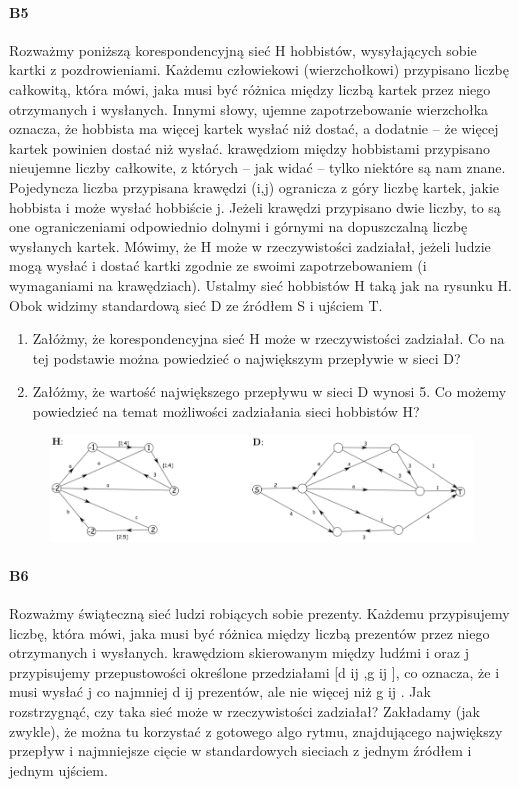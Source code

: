 \paragraph{B5} Rozważmy poniższą korespondencyjną  sieć H hobbistów, wysyłających sobie kartki z pozdrowieniami. Każdemu człowiekowi (wierzchołkowi) przypisano liczbę całkowitą, która mówi, jaka musi być różnica między liczbą  kartek przez niego otrzymanych i wysłanych. Innymi słowy, ujemne zapotrzebowanie wierzchołka oznacza, że hobbista ma więcej kartek wysłać niż dostać, a dodatnie – że więcej kartek powinien dostać niż wysłać. krawędziom między hobbistami przypisano nieujemne liczby całkowite, z których – jak widać – tylko niektóre są nam znane. Pojedyncza liczba przypisana krawędzi (i,j) ogranicza z góry liczbę kartek, jakie hobbista i może wysłać hobbiście j. Jeżeli krawędzi przypisano dwie liczby, to są one ograniczeniami odpowiednio dolnymi i górnymi na dopuszczalną liczbę wysłanych kartek. Mówimy, że H może w rzeczywistości zadziałał, jeżeli ludzie mogą wysłać i dostać kartki zgodnie ze swoimi zapotrzebowaniem (i wymaganiami na krawędziach). Ustalmy sieć hobbistów H taką jak na rysunku H. Obok widzimy standardową sieć D ze źródłem S i ujściem T.
\begin{enumerate}[label=\alph*]
\item Załóżmy, że korespondencyjna sieć H może w rzeczywistości zadziałał. Co na tej podstawie można powiedzieć o największym przepływie w sieci D?
\item Załóżmy, że wartość największego przepływu w sieci D wynosi 5. Co możemy powiedzieć na temat możliwości zadziałania sieci hobbistów H?
\end{enumerate}
\begin{figure}[H]
\centering
\includegraphics[width=.9\textwidth]{img/7_B5}
\end{figure}

\paragraph{B6} Rozważmy świąteczną sieć ludzi robiących sobie prezenty. Każdemu przypisujemy liczbę, która mówi, jaka musi być różnica między liczbą prezentów przez niego otrzymanych i wysłanych. krawędziom skierowanym między ludźmi i oraz j przypisujemy przepustowości określone przedziałami [d ij ,g ij ], co oznacza, że i musi wysłać j co najmniej d ij prezentów, ale nie więcej niż g ij . Jak rozstrzygnąć, czy taka sieć może w rzeczywistości zadziałał? Zakładamy (jak zwykle), że można tu korzystać z gotowego algo rytmu, znajdującego największy przepływ i najmniejsze cięcie w standardowych sieciach z jednym źródłem i jednym ujściem.

